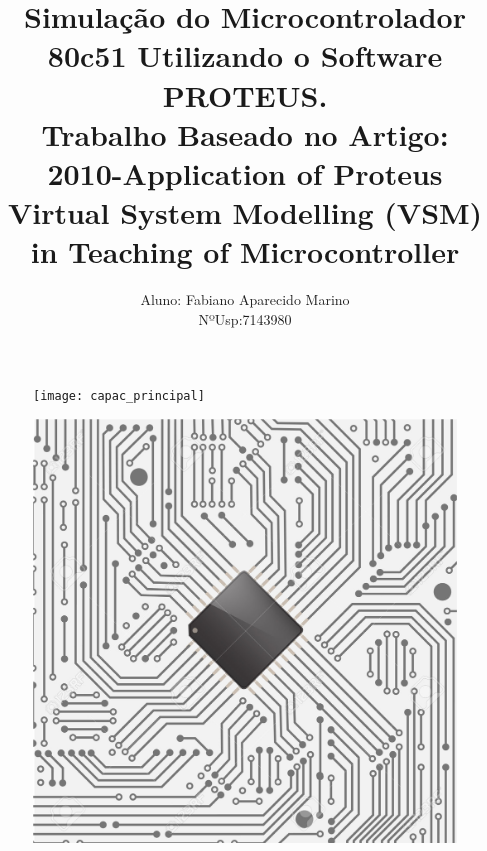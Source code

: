 \documentclass{Fabiano_file}
\title{Simulação do Microcontrolador 80c51 Utilizando o Software PROTEUS.\\Trabalho Baseado no Artigo:\\2010-Application of Proteus Virtual System Modelling (VSM) in Teaching of Microcontroller }
\author{Aluno: Fabiano Aparecido Marino \\NºUsp:7143980}
\begin{document}
	\newpage
	\thispagestyle{empty}
	\clearpage
	\begin{figure}
		\centering
		\texttt{[image: capac\_principal]}
		\label{fig:capac_principal}
	\end{figure}
	\clearpage
	\newpage
	
\maketitle

\begin{figure}[h!]
\centering
\includegraphics[width=.9\textwidth]{capa.jpg}
\end{figure}

\newpage

\tableofcontents
\newpage

\listoffigures
\newpage
\end{document}
